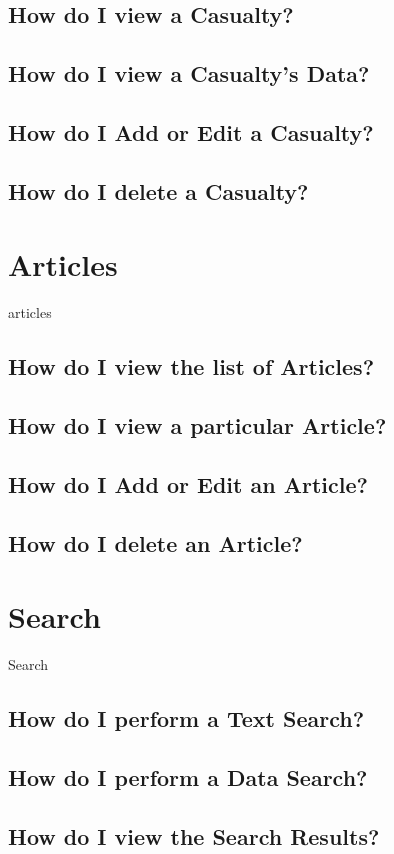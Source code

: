 \documentclass[12pt]{article}
\begin{document}
\subsection{How do I view a Casualty?}
\subsection{How do I view a Casualty's Data?}
\subsection{How do I Add or Edit a Casualty?}
\subsection{How do I delete a Casualty?}


\section{Articles}\label{sec:articles}
articles
\subsection{How do I view the list of Articles?}
\subsection{How do I view a particular Article?}
\subsection{How do I Add or Edit an Article?}
\subsection{How do I delete an Article?}

\section{Search}\label{sec:search}
Search
\subsection{How do I perform a Text Search?}
\subsection{How do I perform a Data Search?}
\subsection{How do I view the Search Results?}
\end{document}
